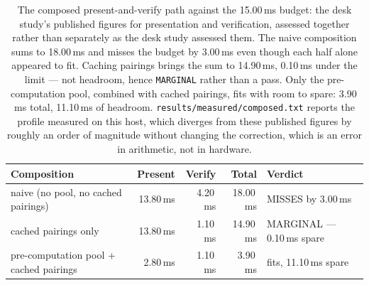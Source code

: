 \begin{table}[h]
\centering\small
\begin{tabular}{>{\raggedright\arraybackslash}p{4.3cm}rrr>{\raggedright\arraybackslash}p{3.7cm}}
\toprule
Composition & Present & Verify & Total & Verdict \\
\midrule
naive (no pool, no cached pairings) & 13.80\,ms & 4.20\,ms & 18.00\,ms & MISSES by 3.00\,ms \\
cached pairings only & 13.80\,ms & 1.10\,ms & 14.90\,ms & MARGINAL --- 0.10\,ms spare \\
pre-computation pool + cached pairings & 2.80\,ms & 1.10\,ms & 3.90\,ms & fits, 11.10\,ms spare \\
\bottomrule
\end{tabular}
\caption{The composed present-and-verify path against the 15.00\,ms budget: the desk study's published figures for presentation and verification, assessed together rather than separately as the desk study assessed them. The naive composition sums to 18.00\,ms and misses the budget by 3.00\,ms even though each half alone appeared to fit. Caching pairings brings the sum to 14.90\,ms, 0.10\,ms under the limit --- not headroom, hence \texttt{MARGINAL} rather than a pass. Only the pre-computation pool, combined with cached pairings, fits with room to spare: 3.90\,ms total, 11.10\,ms of headroom. \texttt{results/\allowbreak measured/\allowbreak composed.txt} reports the profile measured on this host, which diverges from these published figures by roughly an order of magnitude without changing the correction, which is an error in arithmetic, not in hardware.}
\label{tab:composed}
\end{table}
